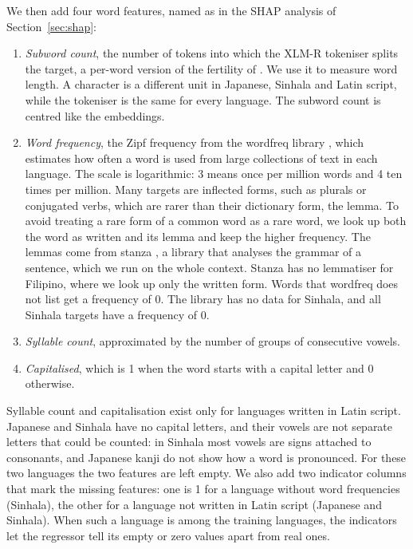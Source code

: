 We then add four word features, named as in the SHAP analysis of Section~\ref{sec:shap}: %
\begin{enumerate}
\item \emph{Subword count}, the number of tokens into which the XLM-R tokeniser splits the target, %
a per-word version of the fertility of \citet{rust-etal-2021-good}. We use it to measure word
length. A character is a different unit in Japanese, Sinhala and Latin script, while the tokeniser
is the same for every language. The subword count is centred like the embeddings. %
\item \emph{Word frequency}, the Zipf frequency from the wordfreq library \citep{speer-2022-wordfreq}, %
which estimates how often a word is used from large collections of text in each language. The
scale is logarithmic: 3 means once per million words and 4 ten times per million. Many targets are %
inflected forms, such as plurals or conjugated verbs, which are rarer than their dictionary form,
the lemma. To avoid treating a rare form of a common word as a rare word, we look up both the word %
as written and its lemma and keep the higher frequency. The lemmas come from stanza
\citep{qi-etal-2020-stanza}, a library that analyses the grammar of a sentence, which we run on %
the whole context. Stanza has no lemmatiser for Filipino, where we look up only the written form. %
Words that wordfreq does not list get a frequency of 0. The library has no data for Sinhala, and all %
Sinhala targets have a frequency of 0. %
\item \emph{Syllable count}, approximated by the number of groups of consecutive vowels. %
\item \emph{Capitalised}, which is 1 when the word starts with a capital letter and 0 otherwise.
\end{enumerate}
Syllable count and capitalisation exist only for languages written in Latin script. Japanese and %
Sinhala have no capital letters, and their vowels are not separate letters that could be counted:
in Sinhala most vowels are signs attached to consonants, and Japanese kanji do not show how a word
is pronounced. For these two languages the two features are left empty. We also add two indicator %
columns that mark the missing features: one is 1 for a language without word frequencies
(Sinhala), the other for a language not written in Latin script (Japanese and Sinhala). When such a %
language is among the training languages, the indicators let the regressor tell its empty or zero
values apart from real ones.

